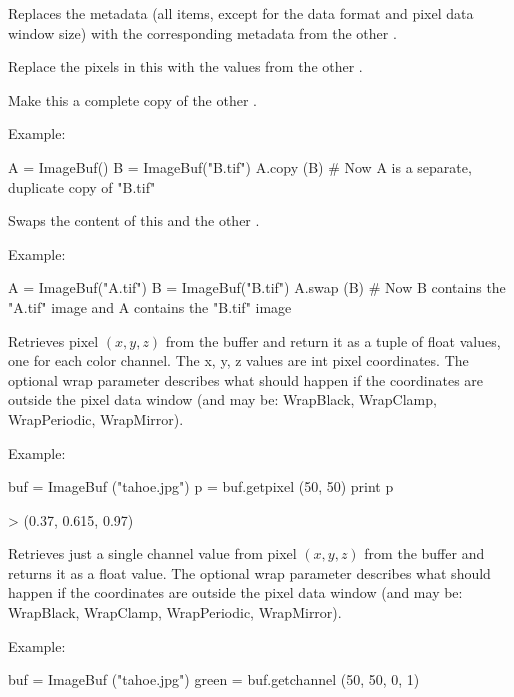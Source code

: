 Replaces the metadata (all \ImageSpec items, except for the data format
and pixel data window size) with the corresponding metadata from the
other \ImageBuf.
\apiend

Replace the pixels in this \ImageBuf with the values from the other
\ImageBuf.
\apiend

Make this \ImageBuf a complete copy of the other \ImageBuf.

\noindent Example:
\begin{code}
    A = ImageBuf()
    B = ImageBuf("B.tif")
    A.copy (B)
    # Now A is a separate, duplicate copy of "B.tif"
\end{code}
\apiend

Swaps the content of this \ImageBuf and the other \ImageBuf.

\noindent Example:
\begin{code}
    A = ImageBuf("A.tif")
    B = ImageBuf("B.tif")
    A.swap (B)
    # Now B contains the "A.tif" image and A contains the "B.tif" image
\end{code}
\apiend

Retrieves pixel $(x,y,z)$ from the buffer and return it as a tuple of
{\cf float} values, one for each color channel.  The {\cf x, y, z} values
are {\cf int} pixel coordinates.  The optional {\cf wrap} parameter
describes what should happen if the coordinates are outside the pixel data
window (and may be: {\cf WrapBlack, WrapClamp, WrapPeriodic, WrapMirror}).

\noindent Example:
\begin{code}
    buf = ImageBuf ("tahoe.jpg")
    p = buf.getpixel (50, 50)
    print p

    > (0.37, 0.615, 0.97)
\end{code}
\apiend

Retrieves just a single channel value from pixel $(x,y,z)$ from the buffer
and returns it as a {\cf float} value.  The optional {\cf wrap} parameter
describes what should happen if the coordinates are outside the pixel data
window (and may be: {\cf WrapBlack, WrapClamp, WrapPeriodic, WrapMirror}).

\noindent Example:
\begin{code}
    buf = ImageBuf ("tahoe.jpg")
    green = buf.getchannel (50, 50, 0, 1)
\end{code}
\apiend


